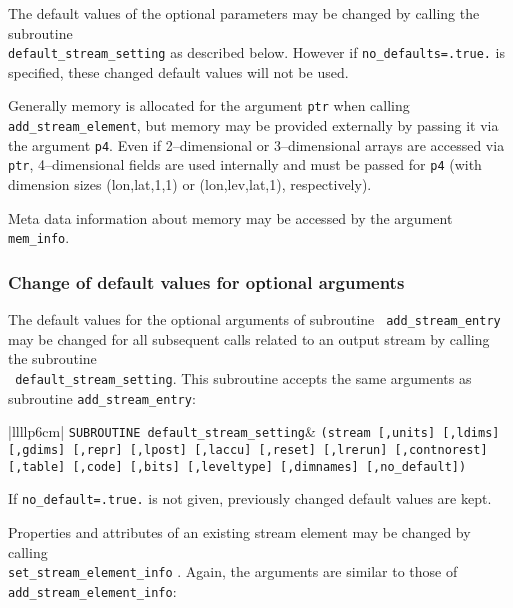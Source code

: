 \begin{description}
  The default values of the optional parameters may be changed by
  calling the subroutine\\ {\tt default\_stream\_setting} as described
  below. However if {\tt no\_defaults=.true.} is specified, these
  changed default values will not be used.

  Generally memory is allocated for the argument {\tt ptr} when
  calling {\tt add\_stream\_element}, but memory may be provided
  externally by passing it via the argument {\tt p4}. Even if
  2--dimensional or 
  3--dimensional arrays are accessed via {\tt ptr}, 4--dimensional
  fields are used internally and must be passed for {\tt p4} (with
  dimension sizes (lon,lat,1,1) or (lon,lev,lat,1), respectively).

  Meta data information about memory may be accessed by the argument {\tt
  mem\_info}.

\end{description}

\subsubsection{Change of default values for optional arguments}

The default values for the optional arguments of subroutine {\tt
add\_stream\_entry}
may be changed for all subsequent calls related to
an output stream by calling the subroutine\\ {\tt
default\_stream\_setting}. 
This subroutine accepts the same arguments
as subroutine {\tt add\_stream\_entry}:

{\small
\begin{tabular}{|llllp{6cm}|}
\hline
{}
{\tt SUBROUTINE default\_stream\_setting}&
   {\tt (stream [,units] [,ldims] [,gdims] [,repr]
         [,lpost] [,laccu] [,reset] [,lrerun] [,contnorest]
         [,table] [,code] [,bits] [,leveltype]
         [,dimnames] [,no\_default])}\\
\hline
\end{tabular}}

If {\tt no\_default=.true.} is not given, previously changed
default values are kept.

Properties and attributes of an existing stream element may be changed
by calling\\ {\tt set\_stream\_element\_info}
. Again, the arguments are
similar to those of {\tt add\_stream\_element\_info}:

